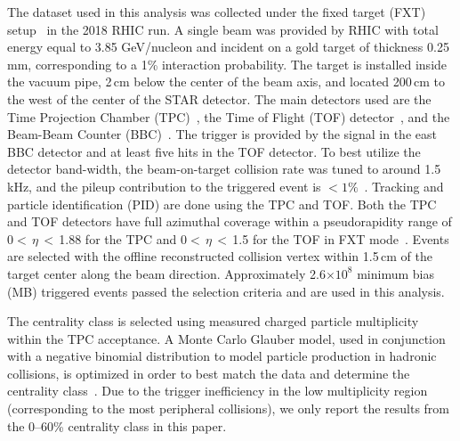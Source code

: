 \documentclass[aps,tightenlines,superscriptaddress,twocolumn]{revtex4-1}
\begin{document}
The dataset used in this analysis
was collected under the fixed target (FXT) setup~\cite{Meehan_2016} in the 2018 RHIC run. 
A single beam was provided by RHIC with total energy equal to 3.85 GeV/nucleon and incident on a gold target of thickness 0.25 mm, corresponding to a 1\% interaction probability.
The target is installed inside the vacuum pipe, 2\,cm below the center of the beam axis, and located 200\,cm to the west of the center of the STAR detector. The main detectors used are the Time Projection Chamber (TPC)~\cite{TPC:2003,Meehan_2016}, the Time of Flight (TOF) detector~\cite{TOF:2012,Meehan_2016}, and the Beam-Beam Counter (BBC)~\cite{BBC_Whitten:2008}. The trigger is provided by the signal in the east BBC detector and at least five hits in the TOF detector.
To best utilize the detector band-width, the beam-on-target collision rate was tuned to around 1.5\,kHz, and the pileup contribution to the triggered event is $<1\%$~\cite{STAR:2021fge}. 
Tracking and particle identification (PID) are done using the TPC and TOF. Both the TPC and TOF detectors have full azimuthal coverage within a pseudorapidity range of 0$<$\,$\eta$\,$<$\,1.88 for the TPC and 0$<$\,$\eta$\,$<$\,1.5 for the TOF in FXT mode~\cite{TPC:2003,TOF:2012,Meehan_2016}.
Events are selected with the offline reconstructed collision vertex within 1.5\,cm of the target center along the beam direction. Approximately 2.6$\times 10^{8}$ minimum bias (MB) triggered events passed the selection criteria and are used in this analysis. 

The centrality class is selected using measured charged particle multiplicity within the TPC acceptance. 
A Monte Carlo Glauber model, used in conjunction with a negative binomial distribution to model particle production in hadronic collisions, is optimized in order to best match the data and determine the centrality class~\cite{MC_Ray_2008,STAR:2021fge}.
Due to the trigger inefficiency in the low multiplicity region (corresponding to the most peripheral collisions), we only report the results from the 0--60\% centrality class in this paper.
\end{document}
